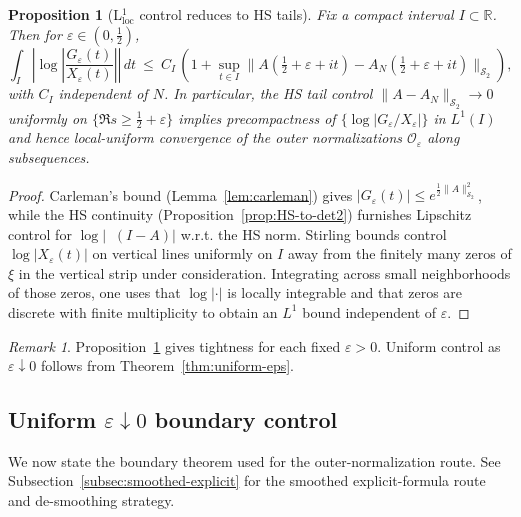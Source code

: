 \documentclass[11pt]{article}
\newtheorem{proposition}[theorem]{Proposition}
\theoremstyle{definition}
\theoremstyle{remark}
\newtheorem{remark}[theorem]{Remark}
\newcommand{\HS}{\mathcal{S}_2}
\DeclareMathOperator{\dettwo}{det_2}
\begin{document}
\begin{proposition}[L$^1_{\mathrm{loc}}$ control reduces to HS tails]\label{prop:L1loc}
Fix a compact interval $I\subset\mathbb R$. Then for \(\varepsilon\in(0,\tfrac12)\),
\[
 \int_{I}\left|\log\left|\frac{G_{\varepsilon}(t)}{X_{\varepsilon}(t)}\right|\right|\,dt\ \le\ C_I\,\left(1+\sup_{t\in I}\|A(\tfrac12+\varepsilon+it)-A_N(\tfrac12+\varepsilon+it)\|_{\HS}\right),
\]
with $C_I$ independent of $N$. In particular, the HS tail control $\|A-A_N\|_{\HS}\to 0$ uniformly on \(\{\Re s\ge \tfrac12+\varepsilon\}\) implies precompactness of \(\{\log|G_{\varepsilon}/X_{\varepsilon}|\}\) in $L^1(I)$ and hence local-uniform convergence of the outer normalizations \(\mathcal O_{\varepsilon}\) along subsequences.
\end{proposition}
\begin{proof}
Carleman's bound (Lemma~\ref{lem:carleman}) gives \(|G_{\varepsilon}(t)|\le e^{\tfrac12\|A\|_{\HS}^2}\), while the HS continuity (Proposition~\ref{prop:HS-to-det2}) furnishes Lipschitz control for \(\log|\dettwo(I-A)|\) w.r.t. the HS norm. Stirling bounds control \(\log|X_{\varepsilon}(t)|\) on vertical lines uniformly on $I$ away from the finitely many zeros of \(\xi\) in the vertical strip under consideration. Integrating across small neighborhoods of those zeros, one uses that \(\log|\cdot|\) is locally integrable and that zeros are discrete with finite multiplicity to obtain an $L^1$ bound independent of \(\varepsilon\).
\end{proof}
\begin{remark}
Proposition~\ref{prop:L1loc} gives tightness for each fixed \(\varepsilon>0\). Uniform control as \(\varepsilon\downarrow 0\) follows from Theorem~\ref{thm:uniform-eps}.
\end{remark}

\subsection{Uniform \(\varepsilon\downarrow 0\) boundary control}\label{subsec:uniform-eps}
We now state the boundary theorem used for the outer-normalization route. See Subsection~\ref{subsec:smoothed-explicit} for the smoothed explicit-formula route and de-smoothing strategy.
\end{document}
